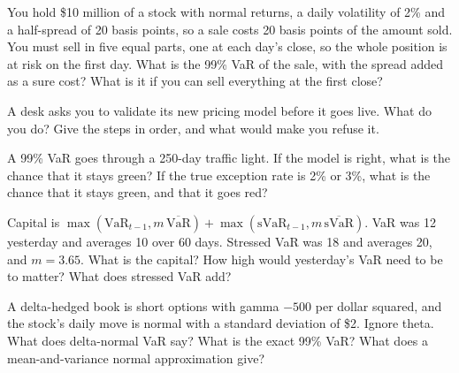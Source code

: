 \begin{question}\label{iq:iv2:risk-validation-and-regulation:22}
You hold \$10 million of a stock with normal returns, a daily volatility of 2\% and a half-spread of 20 basis points, so a sale costs 20 basis points of the amount sold. You must sell in five equal parts, one at each day's close, so the whole position is at risk on the first day. What is the 99\% VaR of the sale, with the spread added as a sure cost? What is it if you can sell everything at the first close?
\end{question}

\begin{question}\label{iq:iv2:risk-validation-and-regulation:23}
A desk asks you to validate its new pricing model before it goes live. What do you do? Give the steps in order, and what would make you refuse it.
\end{question}

\begin{question}\label{iq:iv2:risk-validation-and-regulation:24}
A 99\% VaR goes through a 250-day traffic light. If the model is right, what is the chance that it stays green? If the true exception rate is 2\% or 3\%, what is the chance that it stays green, and that it goes red?
\end{question}

\begin{question}\label{iq:iv2:risk-validation-and-regulation:25}
Capital is $\max(\mathrm{VaR}_{t-1}, m\,\overline{\mathrm{VaR}}) + \max(\mathrm{sVaR}_{t-1}, m\,\overline{\mathrm{sVaR}})$. VaR was 12 yesterday and averages 10 over 60 days. Stressed VaR was 18 and averages 20, and $m = 3.65$. What is the capital? How high would yesterday's VaR need to be to matter? What does stressed VaR add?
\end{question}

\begin{question}\label{iq:iv2:risk-validation-and-regulation:26}
A delta-hedged book is short options with gamma $-500$ per dollar squared, and the stock's daily move is normal with a standard deviation of \$2. Ignore theta. What does delta-normal VaR say? What is the exact 99\% VaR? What does a mean-and-variance normal approximation give?
\end{question}

